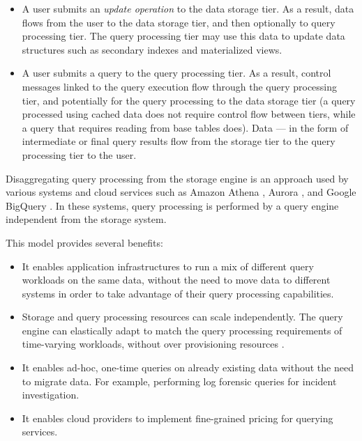 \begin{itemize}
  \item A user submits an \textit{update operation} to the data storage tier.
  As a result, data flows from the user to the data storage tier, and then optionally to query processing tier.
  The query processing tier may use this data to update data structures such as secondary indexes and materialized views.

  \item A user submits a query to the query processing tier.
  As a result, control messages linked to the query execution flow through the query processing tier, and potentially
  for the query processing to the data storage tier (a query processed using cached data does not require control flow
  between tiers, while a query that requires reading from base tables does).
  Data --- in the form of intermediate or final query results flow from the storage tier to the query processing tier to
  the user.
\end{itemize}

\medskip
\noindent
Disaggregating query processing from the storage engine is an approach used by various systems and cloud
services such as Amazon Athena \cite{aws:athena}, Aurora \cite{aws:aurora}, and Google BigQuery
\cite{google:bigquery}.
In these systems, query processing is performed by a query engine independent from the storage system.

This model provides several benefits:
\begin{itemize}
  \item It enables application infrastructures to run a mix of different query workloads on the same data,
  without the need to move data to different systems in order to take advantage of their query processing capabilities.

  \item Storage and query processing resources can scale independently.
  The query engine can elastically adapt to match the query processing requirements of time-varying workloads,
  without over provisioning resources \cite{vuppalapati:elasticqueryengine}.

  \item It enables ad-hoc, one-time queries on already existing data without the need to migrate data.
  For example, performing log forensic queries for incident investigation.

  \item It enables cloud providers to implement fine-grained pricing for querying services.
\end{itemize}

